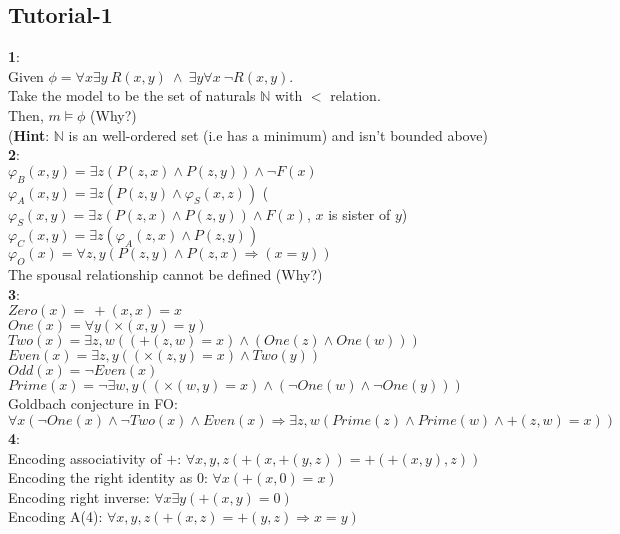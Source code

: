 \documentclass{article}
\begin{document}
\begin{flushleft}
\section{Tutorial-1}
\textbf{1}:\\
Given $\phi= \forall x\exists y \:R(x,y)\: \wedge\: \exists y \forall x\:\neg R(x,y)$.\\
Take the model to be the set of naturals $\mathbb{N}$ with $<$ relation.\\
Then, $m\models \phi$ (Why?)\\
(\textbf{Hint}: $\mathbb{N}$ is an well-ordered set (i.e has a minimum) and isn't bounded above)\\
\textbf{2}:\\
$\varphi_B(x,y)=\exists z(P(z,x)\wedge P(z,y))\wedge \neg F(x)$\\
$\varphi_A(x,y)=\exists z(P(z,y)\wedge \varphi_S(x,z))$   \hspace{4.5mm} ($\varphi_S(x,y)=\exists z(P(z,x)\wedge P(z,y))\wedge F(x)$, $x$ is sister of $y$)\\
$\varphi_C(x,y)=\exists z(\varphi_A(z,x)\wedge P(z,y))$\\
$\varphi_O(x)=\forall z,y (P(z,y)\wedge P(z,x)\Rightarrow (x=y))$\\
The spousal relationship cannot be defined (Why?)\\
\textbf{3}:\\
$Zero(x)=\:+(x,x)=x$\\
$One(x)= \forall y(\times(x,y)=y)$\\
$Two(x)= \exists z,w((+(z,w)=x)\wedge (One(z)\wedge One(w)))$\\
$Even(x)= \exists z,y((\times(z,y)=x)\wedge Two(y))$ \\
$Odd(x)=\neg Even(x)$\\
$Prime(x)=\neg \exists w,y((\times(w,y)=x)\wedge(\neg One(w)\wedge \neg One(y)))$\\
Goldbach conjecture in FO: $\forall x(\neg One(x)\wedge \neg Two(x)\wedge Even(x)\Rightarrow \exists z,w(Prime(z)\wedge Prime(w)\wedge +(z,w)=x))$\\
\textbf{4}:\\
Encoding associativity of $+$:  $\forall x,y,z(+(x,+(y,z))=+(+(x,y),z))$\\
Encoding the right identity as $0$:  $\forall x(+(x,0)=x)$\\
Encoding right inverse: $\forall x\exists y(+(x,y)=0)$\\
Encoding A(4): $\forall x,y,z(+(x,z)=+(y,z)\Rightarrow x=y)$\\

\end{flushleft}
\end{document}
